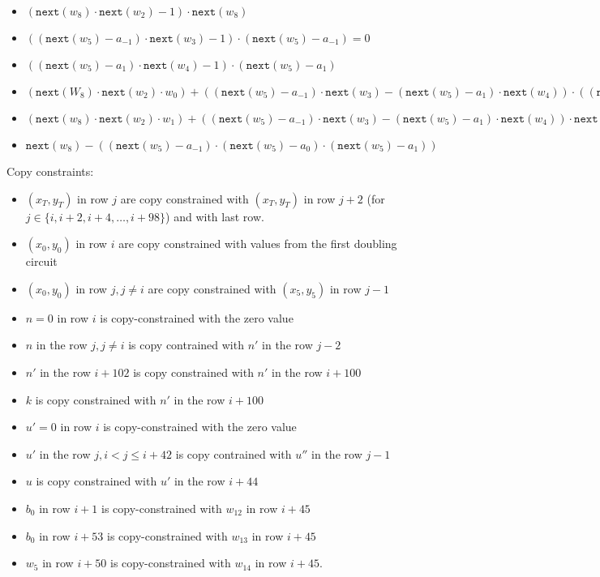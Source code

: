 \begin{itemize}
    \item $(\texttt{next}(w_8) \cdot \texttt{next}(w_2) - 1) \cdot \texttt{next}(w_8)$
    \item $((\texttt{next}(w_5) - a_{-1}) \cdot \texttt{next}(w_3) - 1) \cdot (\texttt{next}(w_5) - a_{-1}) = 0$
    \item $((\texttt{next}(w_5) - a_1) \cdot \texttt{next}(w_4) - 1) \cdot (\texttt{next}(w_5) - a_1)$
	\item $(\texttt{next}(W_8) \cdot \texttt{next}(w_2) \cdot w_0) + ((\texttt{next}(w_5) - a_{-1}) \cdot \texttt{next}(w_3) - (\texttt{next}(w_5) - a_1) \cdot \texttt{next}(w_4)) \cdot ((\texttt{next}(w_5) - a_{-1}) \cdot \texttt{next}(w_3) - (\texttt{next}(w_5) - a_1) \cdot \texttt{next}(w_4)) \cdot \texttt{next}(w_6) - \texttt{next}(w_0) = 0$
    \item $(\texttt{next}(w_8)\cdot \texttt{next}(w_2) \cdot w_1) +((\texttt{next}(w_5) - a_{-1}) \cdot \texttt{next}(w_3) - (\texttt{next}(w_5) - a_1) \cdot \texttt{next}(w_4)) \cdot \texttt{next}(w_7) - \texttt{next}(w_1) = 0$
    \item $\texttt{next}(w_8) - ((\texttt{next}(w_5) - a_{-1}) \cdot (\texttt{next}(w_5) - a_0) \cdot (\texttt{next}(w_5) - a_1))$ 
\end{itemize}    
    Copy constraints:
    \begin{itemize}
    \item $(x_T,y_T)$ in row $j$ are copy constrained with $(x_T,y_T)$ in row $j + 2$ (for $j \in \{i, i + 2, i + 4, \dots, i + 98\}$) and with last row.
    \item $(x_0,y_0)$ in row $i$ are copy constrained with values from the first doubling circuit
    \item $(x_0,y_0)$ in row $j, j \neq i$ are copy constrained with $(x_5,y_5)$ in row $j - 1$ 
    \item $n = 0$ in row $i$ is copy-constrained with the zero value
    \item $n$ in the row $j, j \neq i$ is copy contrained with $n'$ in the row $j-2$
    \item $n'$ in the row $i + 102$ is copy constrained with $n'$ in the row $i + 100$
    \item $k$ is copy constrained with $n'$ in the row $i + 100$
    \item $u' = 0$ in row $i$ is copy-constrained with the zero value
    \item $u'$ in the row $j, i < j \leq i+42 $ is copy contrained with $u''$ in the row $j-1$
    \item $u$ is copy constrained with $u'$ in the row $i + 44$
    \item $b_0$ in row $i+1$ is copy-constrained with $w_{12}$ in row $i + 45$
    \item $b_0$ in row $i+53$ is copy-constrained with $w_{13}$ in row $i + 45$
    \item $w_5$ in row $i+50$ is copy-constrained with $w_{14}$ in row $i + 45$.
\end{itemize}

